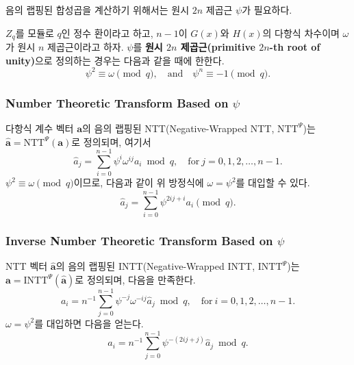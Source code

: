 음의 랩핑된 합성곱을 계산하기 위해서는 원시 $2n$ 제곱근 $\psi$가 필요하다.

\begin{tcolorbox}[colback=white, boxrule=0.7pt, sharp corners]
\begin{definition}
$Z_q$를 모듈로 $q$인 정수 환이라고 하고, $n-1$이 $G(x)$와 $H(x)$의 다항식 차수이며 $\omega$가 원시 $n$ 제곱근이라고 하자. $\psi$를 \textbf{원시 $2n$ 제곱근(primitive $2n$-th root of unity)}으로 정의하는 경우는 다음과 같을 때에 한한다.
\begin{equation}
    \psi^2 \equiv \omega \pmod q, \quad \text{and} \quad \psi^n \equiv -1 \pmod q.
\end{equation}
\end{definition}
\end{tcolorbox}

\subsubsection{Number Theoretic Transform Based on $\psi$}

\begin{tcolorbox}[colback=white, boxrule=0.7pt, sharp corners]
\begin{definition}
다항식 계수 벡터 $\mathbf{a}$의 음의 랩핑된 NTT(Negative-Wrapped NTT, $\text{NTT}^{\Psi}$)는 $\mathbf{\hat{a}} = \text{NTT}^{\Psi}(\mathbf{a})$로 정의되며, 여기서
\begin{equation}
    \label{equ:ntt_psi}
    \hat{a}_j = \sum_{i=0}^{n-1} \psi^i \omega^{ij} a_i \bmod q, \quad \text{for} \ j = 0, 1, 2, \dots, n-1.
\end{equation}
$\psi^2 \equiv \omega \pmod q$이므로, 다음과 같이 위 방정식에 $\omega = \psi^2$를 대입할 수 있다.
\begin{equation}
    \label{equ:ntt_psi_omega}
    \hat{a}_j = \sum_{i=0}^{n-1} \psi^{2ij+i} a_i \pmod q.
\end{equation}
\end{definition}
\end{tcolorbox}

\subsubsection{Inverse Number Theoretic Transform Based on $\psi$}

\begin{tcolorbox}[colback=white, boxrule=0.7pt, sharp corners]
\begin{definition}
NTT 벡터 $\mathbf{\hat{a}}$의 음의 랩핑된 INTT(Negative-Wrapped INTT, $\text{INTT}^{\Psi}$)는 $\mathbf{a} = \text{INTT}^{\Psi}(\mathbf{\hat{a}})$로 정의되며, 다음을 만족한다.
\begin{equation}
    a_i = n^{-1}\sum_{j=0}^{n-1} \psi^{-j}\omega^{-ij}\hat{a}_j \bmod q, \quad \text{for} \ i = 0, 1, 2, \dots, n-1.
\end{equation}
$\omega = \psi^2$를 대입하면 다음을 얻는다.
\begin{equation}
    \label{equ:intt_psi_omega}
    a_i = n^{-1}\sum_{j=0}^{n-1} \psi^{-(2ij+j)}\hat{a}_j \bmod q.
\end{equation}
\end{definition}
\end{tcolorbox}

